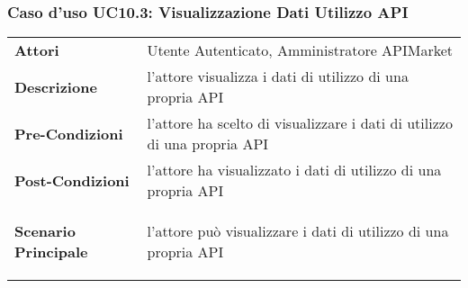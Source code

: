 \subsubsection{Caso d'uso UC10.3: Visualizzazione Dati Utilizzo API}
\label{UC10.3}

\renewcommand*{\arraystretch}{1.6}
\begin{longtable}{ l | p{11cm}}
	\hline
	\rowcolor{Gray}
	\multicolumn{2}{c}{UC10.3: Visualizzazione Dati Utilizzo API} \\
	\hline
	\textbf{Attori} &Utente Autenticato, Amministratore APIMarket \\
	\textbf{Descrizione} & l'attore visualizza i dati di utilizzo di una propria API\\
	\textbf{Pre-Condizioni} & l'attore ha scelto di visualizzare i dati di utilizzo di una propria API\\
	\textbf{Post-Condizioni}& l'attore ha visualizzato i dati di utilizzo di una propria API\\
	\textbf{Scenario Principale} & \begin{enumerate*}[label=(\arabic*.),itemjoin={\newline}]
		\item l'attore può visualizzare i dati di utilizzo di una propria API
	\end{enumerate*}\\
\end{longtable}
